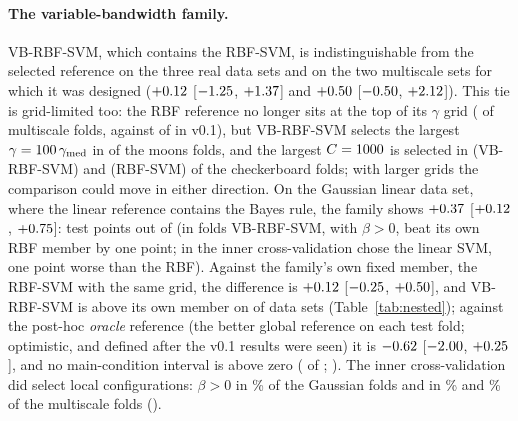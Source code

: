 \documentclass[11pt,a4paper]{article}
\theoremstyle{plain}
\theoremstyle{definition}
\theoremstyle{remark}
\begin{document}
\paragraph{The variable-bandwidth family.} VB-RBF-SVM, which contains the RBF-SVM, is indistinguishable from the selected reference on the three real data sets and on the two multiscale sets for which it was designed ($+0.12$ [$-1.25$, $+1.37$] and $+0.50$ [$-0.50$, $+2.12$]). This tie is grid-limited too: the RBF reference no longer sits at the top of its $\gamma$ grid (\EdgeMainMultiRbfGammaHi{} of \EdgeMainMultiRbfGammaN{} multiscale folds, against \VOneEdgeRbfGammaHi{} of \VOneMultiFolds{} in v0.1), but VB-RBF-SVM selects the largest $\gamma=100\,\gamma_{\mathrm{med}}$ in \EdgeMainMoonsVbGammaHi{} of the \EdgeMainFoldsPerSet{} moons folds, and the largest $C=1000$ is selected in \EdgeMainCheckVbCHi{} (VB-RBF-SVM) and \EdgeMainCheckRbfCHi{} (RBF-SVM) of the \EdgeMainFoldsPerSet{} checkerboard folds; with larger grids the comparison could move in either direction. On the Gaussian linear data set, where the linear reference contains the Bayes rule, the family shows $+0.37$ [$+0.12$, $+0.75$]: \GaussCellPts{} test points out of \GaussCellN{} (in \GaussVbOwnFolds{} folds VB-RBF-SVM, with $\beta>0$, beat its own RBF member by one point; in \GaussSelLinVbGainFolds{} the inner cross-validation chose the linear SVM, one point worse than the RBF). Against the family's own fixed member, the RBF-SVM with the same grid, the difference is $+0.12$ [$-0.25$, $+0.50$], and VB-RBF-SVM is above its own member on \NestNPosMainVb{} of \NDatasets{} data sets (Table~\ref{tab:nested}); against the post-hoc \emph{oracle} reference (the better global reference on each test fold; optimistic, and defined after the v0.1 results were seen) it is $-0.62$ [$-2.00$, $+0.25$], and no main-condition interval is above zero (\PostNPosMain{} of \NCellsMain; ). The inner cross-validation did select local configurations: $\beta>0$ in \LocalFracMainGaussVb\% of the Gaussian folds and in \LocalFracMainMoonsVb\% and \LocalFracMainCheckVb\% of the multiscale folds ().
\end{document}
